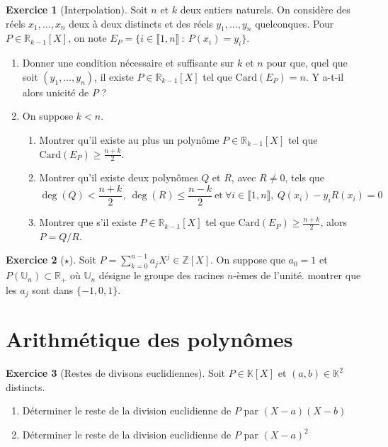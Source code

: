 \documentclass[french]{book}
\newcommand{\Z}{\mathbb{Z}}
\newcommand{\R}{\mathbb{R}}
\newcommand{\K}{\mathbb{K}}
\newcommand{\U}{\mathbb{U}}
\newcommand{\card}{\text{Card}}
\theoremstyle{definition}
\newtheorem{ex}{Exercice}[chapter]
\theoremstyle{theorem}
\theoremstyle{remark}
\begin{document}
\begin{ex}[Interpolation]
	Soit $n$ et $k$ deux entiers naturels. On considère des réels $x_1,\ldots,x_n$ deux à deux distincts et des réels $y_1,\ldots,y_n$ quelconques. Pour $P\in\R_{k-1}[X]$, on note $E_P=\{i\in\llbracket1,n\rrbracket\ : \ P(x_i)=y_i\}$.
	\begin{enumerate}
		\item Donner une condition nécessaire et suffisante sur $k$ et $n$ pour que, quel que soit $(y_1,\ldots,y_n)$, il existe $P\in\R_{k-1}[X]$ tel que $\card(E_P)=n$. Y a-t-il alors unicité de $P$ ?
		\item On suppose $k< n$.
		\begin{enumerate}[label=\alph*.]
			\item Montrer qu'il existe au plus un polynôme $P\in\R_{k-1}[X]$ tel que $\displaystyle\card(E_P)\geqslant\frac{n+k}{2}$.
			\item Montrer qu'il existe deux polynômes $Q$ et $R$, avec $R\ne 0$, tels que $$\deg(Q)<\frac{n+k}{2},\ \deg(R)\leqslant\frac{n-k}{2}\ \text{et}\ \forall i\in\llbracket1,n\rrbracket,\ Q(x_i)-y_iR(x_i)=0$$
			\item Montrer que s'il existe $P\in\R_{k-1}[X]$ tel que $\displaystyle\card(E_P)\geqslant\frac{n+k}{2}$, alors $P=Q/R$.
		\end{enumerate}
	\end{enumerate}
\end{ex}

\begin{ex}[$\star$]
	Soit $P=\displaystyle\sum_{k=0}^{n-1}a_jX^j\in\Z[X]$. On suppose que $a_0=1$ et $P(\U_n)\subset\R_+$ où $\U_n$ désigne le groupe des racines $n$-èmes de l'unité. montrer que les $a_j$ sont dans $\{-1,0,1\}$.
\end{ex}

\section{Arithmétique des polynômes}

\begin{ex}[Restes de divisons euclidiennes]
	Soit $P \in \K[X]$ et $(a,b) \in\K^2$ distincts. 
	\begin{enumerate}
		\item Déterminer le reste de la division euclidienne de $P$ par $(X-a)(X-b)$
		\item Déterminer le reste de la division euclidienne de $P$ par $(X-a)^2$
	\end{enumerate}
\end{ex}
\end{document}
